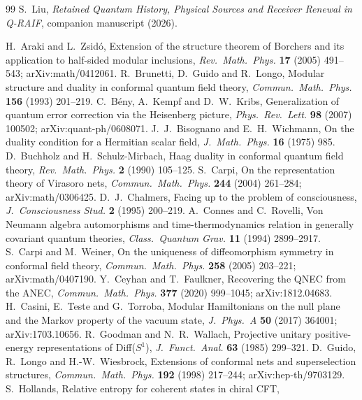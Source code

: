 \documentclass[12pt]{article}
\theoremstyle{definition}
\theoremstyle{remark}
\begin{document}
\begin{thebibliography}{99}
 S.~Liu, \emph{Retained Quantum History, Physical Sources and Receiver Renewal in Q-RAIF}, companion manuscript (2026).
\raggedright

 H.~Araki and L.~Zsid\'o, Extension of the structure theorem of Borchers
and its application to half-sided modular inclusions, \emph{Rev.\ Math.\ Phys.}
\textbf{17} (2005) 491--543; arXiv:math/0412061.
 R.~Brunetti, D.~Guido and R.~Longo, Modular structure and duality in
conformal quantum field theory, \emph{Commun.\ Math.\ Phys.} \textbf{156} (1993) 201--219.
 C.~B\'eny, A.~Kempf and D.~W.~Kribs, Generalization of quantum error
correction via the Heisenberg picture, \emph{Phys.\ Rev.\ Lett.} \textbf{98} (2007)
100502; arXiv:quant-ph/0608071.
 J.~J.~Bisognano and E.~H.~Wichmann, On the duality condition for a Hermitian
scalar field, \emph{J.\ Math.\ Phys.} \textbf{16} (1975) 985.
 D.~Buchholz and H.~Schulz-Mirbach, Haag duality in conformal quantum field theory, \emph{Rev.\ Math.\ Phys.} \textbf{2} (1990) 105--125.
 S.~Carpi, On the representation theory of Virasoro nets,
\emph{Commun.\ Math.\ Phys.} \textbf{244} (2004) 261--284; arXiv:math/0306425.
 D.~J.~Chalmers, Facing up to the problem of consciousness, \emph{J.\ Consciousness Stud.} \textbf{2} (1995) 200--219.
 A.~Connes and C.~Rovelli, Von Neumann algebra automorphisms and time-thermodynamics relation in generally covariant quantum theories,
\emph{Class.\ Quantum Grav.} \textbf{11} (1994) 2899--2917.
 S.~Carpi and M.~Weiner, On the uniqueness of diffeomorphism symmetry in
conformal field theory, \emph{Commun.\ Math.\ Phys.} \textbf{258} (2005) 203--221; arXiv:math/0407190.
 Y.~Ceyhan and T.~Faulkner, Recovering the QNEC from the ANEC,
\emph{Commun.\ Math.\ Phys.} \textbf{377} (2020) 999--1045; arXiv:1812.04683.
 H.~Casini, E.~Teste and G.~Torroba, Modular Hamiltonians on the null
plane and the Markov property of the vacuum state, \emph{J.\ Phys.\ A} \textbf{50}
(2017) 364001; arXiv:1703.10656.
 R.~Goodman and N.~R.~Wallach, Projective unitary positive-energy representations of Diff(\(S^1\)), \emph{J.\ Funct.\ Anal.} \textbf{63} (1985) 299--321.
 D.~Guido, R.~Longo and H.-W.~Wiesbrock, Extensions of conformal nets and
superselection structures, \emph{Commun.\ Math.\ Phys.} \textbf{192} (1998) 217--244;
arXiv:hep-th/9703129.
 S.~Hollands, Relative entropy for coherent states in chiral CFT,

\end{thebibliography}
\end{document}
